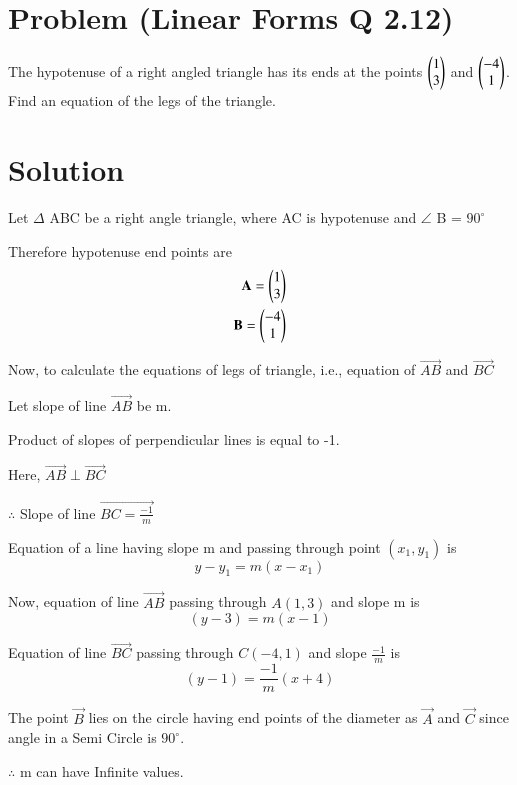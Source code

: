 \documentclass[journal,12pt,twocolumn]{IEEEtran}
\begin{document}
\section*{\textbf{Problem (Linear Forms Q 2.12)}}
The hypotenuse of a right angled triangle has its ends at the points $\begin{pmatrix}1\\3\end{pmatrix}$ and $\begin{pmatrix}-4\\1\end{pmatrix}$. Find an equation of the legs of the triangle.
\section*{\textbf{Solution}}
Let $\Delta$ ABC be a right angle triangle, where AC is hypotenuse and $\angle$ B = $90^{\circ}$

Therefore hypotenuse end points are
\begin{align}
    \mathbf{A} = \begin{pmatrix}1\\3\end{pmatrix} \\
    \mathbf{B} = \begin{pmatrix}-4\\1\end{pmatrix}
\end{align}

Now, to calculate the equations of legs of triangle, i.e., equation of $\vec{AB}$ and $\vec{BC}$

Let slope of line $\vec{AB}$ be m.

Product of slopes of perpendicular lines is equal to -1.

Here, $\vec{AB} \perp \vec{BC}$

$\therefore$ Slope of line $\vec{BC = \frac{-1}{m}}$ 

Equation of a line having slope m and passing through point $(x_1,y_1)$ is
\begin{equation}
    y - y_1 = m(x - x_1)
\end{equation}

Now, equation of line $\vec{AB}$ passing through $A(1,3)$ and slope m is 
\begin{equation}
    (y-3) = m(x-1)
\end{equation}

Equation of line $\vec{BC}$ passing through $C(-4,1)$ and slope $\frac{-1}{m}$ is 
\begin{equation}
    (y-1) = \frac{-1}{m}(x+4)
\end{equation}

The point $\vec{B}$ lies on the circle having end points of the diameter as $\vec{A}$ and $\vec{C}$ since angle in a Semi Circle is $90^{\circ}$.

$\therefore$ m can have Infinite values.
\end{document}
